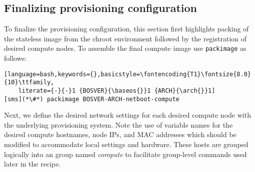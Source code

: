 \subsection{Finalizing provisioning configuration} \label{sec:assemble_bootstrap}

To finalize the \xCAT{} provisioning configuration, this section first highlights
packing of the stateless image from the chroot environment followed by the
registration of desired compute nodes. To assemble the final compute image use
\texttt{packimage} as follows:

\begin{lstlisting}[language=bash,keywords={},basicstyle=\fontencoding{T1}\fontsize{8.0}{10}\ttfamily,
    literate={-}{-}1 {BOSVER}{\baseos{}}1 {ARCH}{\arch{}}1]
[sms](*\#*) packimage BOSVER-ARCH-netboot-compute
\end{lstlisting}


Next, we define the desired network settings for each desired compute node
with the underlying provisioning system.  Note the use of variable names for
the desired compute hostnames, node IPs, and MAC addresses which should be
modified to accommodate local settings and hardware. These hosts are grouped
logically into an \xCAT{} group named {\em compute} to facilitate group-level
commands used later in the recipe.



